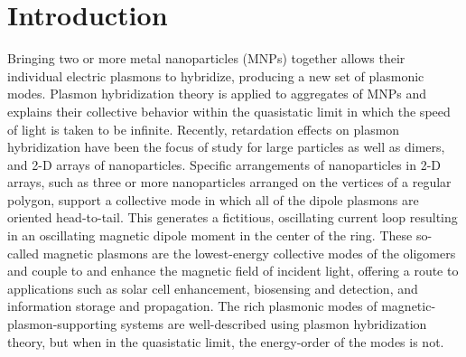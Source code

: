 \documentclass[journal=apchd5,manuscript=article]{achemso}
\begin{document}
\section{Introduction}
Bringing two or more metal nanoparticles (MNPs) together allows their individual electric plasmons to hybridize, producing a new set of plasmonic modes\cite{Lucas1976,ARAVIND1981,Xu1995,Mischenko1995}. Plasmon hybridization theory is applied to aggregates of MNPs and explains their collective behavior within the quasistatic limit in which the speed of light is taken to be infinite\cite{NordHal2003,NordProdan2004,Oubre2004,Gomez2009}. Recently, retardation effects on plasmon hybridization have been the focus of study for large particles\cite{Abajo2008,Gu2010} as well as dimers\cite{vonPlessen2007,Rechbacher2003,Kottman2001}, and 2-D arrays\cite{Schatz2003,Royer2005,Chumanov2010} of nanoparticles. Specific arrangements of nanoparticles in 2-D arrays, such as three or more nanoparticles arranged on the vertices of a regular polygon, support a collective mode in which all of the dipole plasmons are oriented head-to-tail. This generates a fictitious, oscillating current loop resulting in an oscillating magnetic dipole moment in the center of the ring\cite{Alu2006,Alu2008,Liu2011,Nord2006,Cherqui2014,Cherqui2016}. These so-called magnetic plasmons are the lowest-energy collective modes of the oligomers and couple to and enhance the magnetic field of incident light\cite{Shalaev2007,Qian2015,Nord2007}, offering a route to applications such as solar cell enhancement\cite{Graydon2011,Alu2014solar,Le2015solar}, biosensing and detection\cite{Zia2010trans,Noginova2008trans,Wang:13,Fan2015,Wei2015,Shvets2012,Altug2012bio,Nord2011fano}, and information storage and propagation\cite{Zhang2006,NordHal2011,NordHal2012}. The rich plasmonic modes of magnetic-plasmon-supporting systems are well-described using plasmon hybridization theory, but when in the quasistatic limit, the energy-order of the modes is not.
\end{document}
